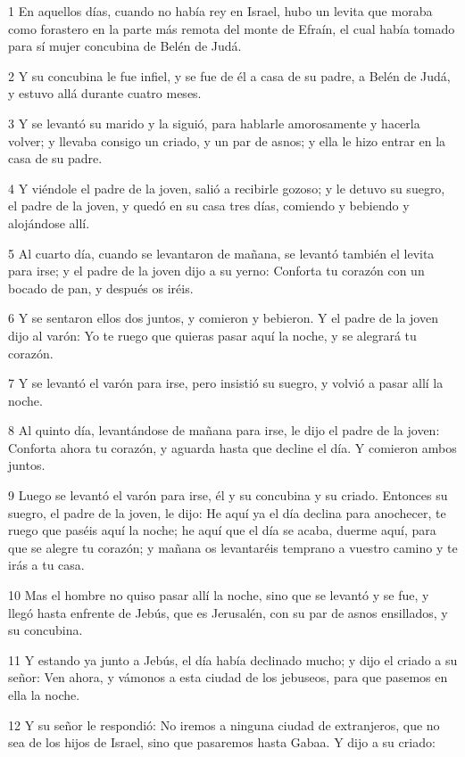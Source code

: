 \par 1 En aquellos días, cuando no había rey en Israel, hubo un levita que moraba como forastero en la parte más remota del monte de Efraín, el cual había tomado para sí mujer concubina de Belén de Judá.
\par 2 Y su concubina le fue infiel, y se fue de él a casa de su padre, a Belén de Judá, y estuvo allá durante cuatro meses. 
\par 3 Y se levantó su marido y la siguió, para hablarle amorosamente y hacerla volver; y llevaba consigo un criado, y un par de asnos; y ella le hizo entrar en la casa de su padre.
\par 4 Y viéndole el padre de la joven, salió a recibirle gozoso; y le detuvo su suegro, el padre de la joven, y quedó en su casa tres días, comiendo y bebiendo y alojándose allí.
\par 5 Al cuarto día, cuando se levantaron de mañana, se levantó también el levita para irse; y el padre de la joven dijo a su yerno: Conforta tu corazón con un bocado de pan, y después os iréis.
\par 6 Y se sentaron ellos dos juntos, y comieron y bebieron. Y el padre de la joven dijo al varón: Yo te ruego que quieras pasar aquí la noche, y se alegrará tu corazón.
\par 7 Y se levantó el varón para irse, pero insistió su suegro, y volvió a pasar allí la noche.
\par 8 Al quinto día, levantándose de mañana para irse, le dijo el padre de la joven: Conforta ahora tu corazón, y aguarda hasta que decline el día. Y comieron ambos juntos.
\par 9 Luego se levantó el varón para irse, él y su concubina y su criado. Entonces su suegro, el padre de la joven, le dijo: He aquí ya el día declina para anochecer, te ruego que paséis aquí la noche; he aquí que el día se acaba, duerme aquí, para que se alegre tu corazón; y mañana os levantaréis temprano a vuestro camino y te irás a tu casa.
\par 10 Mas el hombre no quiso pasar allí la noche, sino que se levantó y se fue, y llegó hasta enfrente de Jebús, que es Jerusalén, con su par de asnos ensillados, y su concubina.
\par 11 Y estando ya junto a Jebús, el día había declinado mucho; y dijo el criado a su señor: Ven ahora, y vámonos a esta ciudad de los jebuseos, para que pasemos en ella la noche.
\par 12 Y su señor le respondió: No iremos a ninguna ciudad de extranjeros, que no sea de los hijos de Israel, sino que pasaremos hasta Gabaa. Y dijo a su criado:
